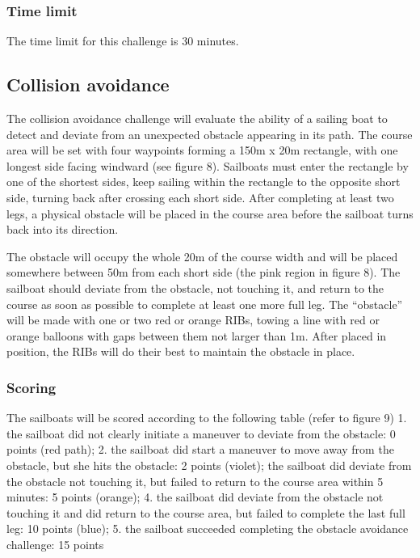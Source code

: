 \documentclass[12pt]{article}
\begin{document}
\subsubsection{Time limit}
The time limit for this challenge is 30 minutes.


\subsection{Collision avoidance}

The collision avoidance challenge will evaluate the ability of a sailing boat to
detect and deviate
from an unexpected obstacle appearing in its path. The course area will be set
with four
waypoints forming a 150m x 20m rectangle, with one longest side facing windward
(see figure
8). Sailboats must enter the rectangle by one of the shortest sides, keep
sailing within the
rectangle to the opposite short side, turning back after crossing each short
side. After
completing at least two legs, a physical obstacle will be placed in the course
area before the
sailboat turns back into its direction.

The obstacle will occupy the whole 20m of the course width and will be placed
somewhere
between 50m from each short side (the pink region in figure 8). The sailboat
should deviate
from the obstacle, not touching it, and return to the course as soon as possible
to complete at
least one more full leg. The “obstacle” will be made with one or two red or
orange RIBs, towing
a line with red or orange balloons with gaps between them not larger than 1m.
After placed in
position, the RIBs will do their best to maintain the obstacle in place.

\subsubsection{Scoring}
The sailboats will be scored according to the following table (refer to figure
9)
1. the sailboat did not clearly initiate a maneuver to deviate from the
obstacle: 0 points (red
path);
2. the sailboat did start a maneuver to move away from the obstacle, but she
hits the obstacle: 2
points (violet);
the sailboat did deviate from the obstacle not touching it, but failed to return
to the course
area within 5 minutes: 5 points (orange);
4. the sailboat did deviate from the obstacle not touching it and did return to
the course area,
but failed to complete the last full leg: 10 points (blue);
5. the sailboat succeeded completing the obstacle avoidance challenge: 15 points
\end{document}
